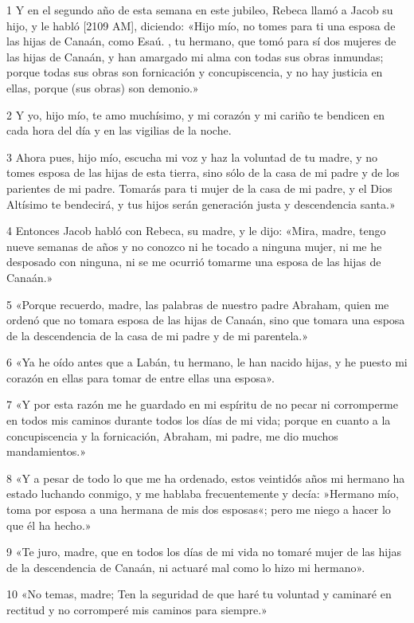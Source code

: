 \par 1 Y en el segundo año de esta semana en este jubileo, Rebeca llamó a Jacob su hijo, y le habló [2109 AM], diciendo: «Hijo mío, no tomes para ti una esposa de las hijas de Canaán, como Esaú. , tu hermano, que tomó para sí dos mujeres de las hijas de Canaán, y han amargado mi alma con todas sus obras inmundas; porque todas sus obras son fornicación y concupiscencia, y no hay justicia en ellas, porque (sus obras) son demonio.»
\par 2 Y yo, hijo mío, te amo muchísimo, y mi corazón y mi cariño te bendicen en cada hora del día y en las vigilias de la noche.
\par 3 Ahora pues, hijo mío, escucha mi voz y haz la voluntad de tu madre, y no tomes esposa de las hijas de esta tierra, sino sólo de la casa de mi padre y de los parientes de mi padre. Tomarás para ti mujer de la casa de mi padre, y el Dios Altísimo te bendecirá, y tus hijos serán generación justa y descendencia santa.»
\par 4 Entonces Jacob habló con Rebeca, su madre, y le dijo: «Mira, madre, tengo nueve semanas de años y no conozco ni he tocado a ninguna mujer, ni me he desposado con ninguna, ni se me ocurrió tomarme una esposa de las hijas de Canaán.»
\par 5 «Porque recuerdo, madre, las palabras de nuestro padre Abraham, quien me ordenó que no tomara esposa de las hijas de Canaán, sino que tomara una esposa de la descendencia de la casa de mi padre y de mi parentela.»
\par 6 «Ya he oído antes que a Labán, tu hermano, le han nacido hijas, y he puesto mi corazón en ellas para tomar de entre ellas una esposa».
\par 7 «Y por esta razón me he guardado en mi espíritu de no pecar ni corromperme en todos mis caminos durante todos los días de mi vida; porque en cuanto a la concupiscencia y la fornicación, Abraham, mi padre, me dio muchos mandamientos.»
\par 8 «Y a pesar de todo lo que me ha ordenado, estos veintidós años mi hermano ha estado luchando conmigo, y me hablaba frecuentemente y decía: »Hermano mío, toma por esposa a una hermana de mis dos esposas«; pero me niego a hacer lo que él ha hecho.»
\par 9 «Te juro, madre, que en todos los días de mi vida no tomaré mujer de las hijas de la descendencia de Canaán, ni actuaré mal como lo hizo mi hermano».
\par 10 «No temas, madre; Ten la seguridad de que haré tu voluntad y caminaré en rectitud y no corromperé mis caminos para siempre.»
